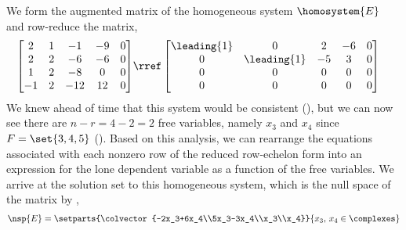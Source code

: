 We form the augmented matrix of the homogeneous system $\homosystem{E}$ and row-reduce the matrix,
%
\begin{align*}
\begin{bmatrix}
2 & 1 & -1 & -9 & 0 \\
2 & 2 & -6 & -6 & 0 \\
1 & 2 & -8 & 0 & 0 \\
-1 & 2 & -12 & 12 & 0 
\end{bmatrix}
&\rref
\begin{bmatrix}
\leading{1} & 0 & 2 & -6 & 0 \\
0 & \leading{1} & -5 & 3 & 0 \\
0 & 0 & 0 & 0 & 0 \\
0 & 0 & 0 & 0 & 0 
\end{bmatrix}
\end{align*}
%
We knew ahead of time that this system would be consistent (), but we can now see there are $n-r=4-2=2$ free variables, namely $x_3$ and $x_4$ since $F=\set{3,4,5}$ ().  Based on this analysis, we can rearrange the equations associated with each nonzero row of the reduced row-echelon form into an expression for the lone dependent variable as a function of the free variables.  We arrive at the solution set to this homogeneous system, which is the null space of the matrix by ,
%
\begin{align*}
\nsp{E}=\setparts{\colvector{-2x_3+6x_4\\5x_3-3x_4\\x_3\\x_4}}{x_3,\,x_4\in\complexes}
\end{align*}
%